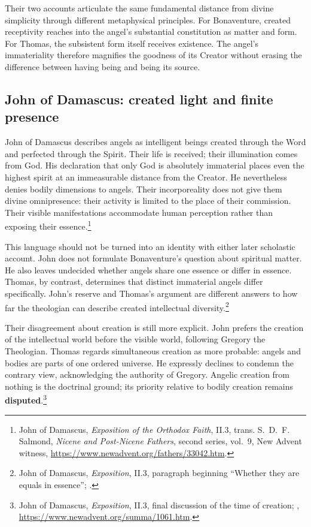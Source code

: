 Their two accounts articulate the same fundamental distance from divine
simplicity through different metaphysical principles. For Bonaventure,
created receptivity reaches into the angel's substantial constitution as
matter and form. For Thomas, the subsistent form itself receives existence.
The angel's immateriality therefore magnifies the goodness of its Creator
without erasing the difference between having being and being its source.

\subsection{John of Damascus: created light and finite presence}

John of Damascus describes angels as intelligent beings created through the
Word and perfected through the Spirit. Their life is received; their
illumination comes from God. His declaration that only God is absolutely
immaterial places even the highest spirit at an immeasurable distance from
the Creator. He nevertheless denies bodily dimensions to angels. Their
incorporeality does not give them divine omnipresence: their activity is
limited to the place of their commission. Their visible manifestations
accommodate human perception rather than exposing their essence.\footnote{John
of Damascus, \emph{Exposition of the Orthodox Faith}, II.3, trans.
S.~D.~F. Salmond, \emph{Nicene and Post-Nicene Fathers}, second
series, vol.~9, New Advent witness,
\url{https://www.newadvent.org/fathers/33042.htm}.}

This language should not be turned into an identity with either later
scholastic account. John does not formulate Bonaventure's question about
spiritual matter. He also leaves undecided whether angels share one essence
or differ in essence. Thomas, by contrast, determines that distinct
immaterial angels differ specifically. John's reserve and Thomas's argument
are different answers to how far the theologian can describe created
intellectual diversity.\footnote{John of Damascus, \emph{Exposition}, II.3,
paragraph beginning ``Whether they are equals in essence''; .}

Their disagreement about creation is still more explicit. John prefers the
creation of the intellectual world before the visible world, following
Gregory the Theologian. Thomas regards simultaneous creation as more probable:
angels and bodies are parts of one ordered universe. He expressly declines
to condemn the contrary view, acknowledging the authority of Gregory.
Angelic creation from nothing is the doctrinal ground; its priority relative
to bodily creation remains \textbf{disputed}.\footnote{John of Damascus,
\emph{Exposition}, II.3, final discussion of the time of creation;
,
\url{https://www.newadvent.org/summa/1061.htm}.}

